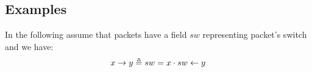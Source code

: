 \subsection{Examples}

In the following assume that packets have a field $sw$
representing packet's switch and we have:
\begin{equation*}
    x \rightarrow y \triangleq sw = x \cdot sw \leftarrow y
\end{equation*}





